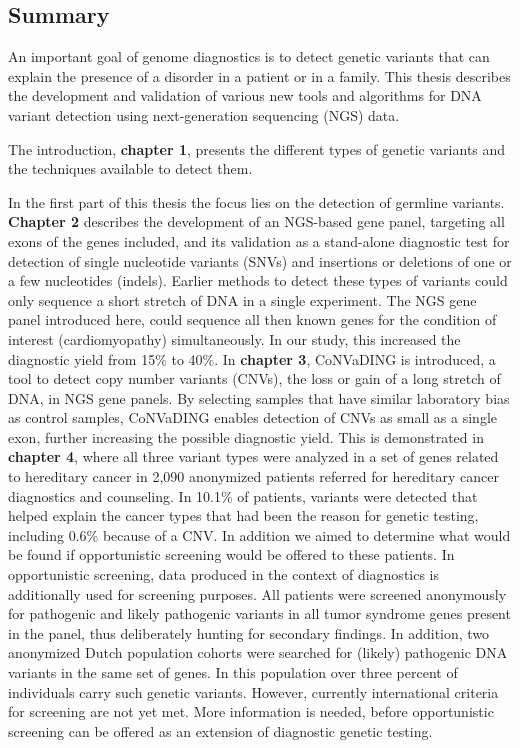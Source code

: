 \begin{appendices}
	
	\chapter{Summary}
	An important goal of genome diagnostics is to detect genetic variants that can explain the presence of a disorder in a patient or in a family. This thesis describes the development and validation of various new tools and algorithms for DNA variant detection using next-generation sequencing (NGS) data.

	The introduction, \textbf{chapter 1}, presents the different types of genetic variants and the techniques available to detect them.

	In the first part of this thesis the focus lies on the detection of germline variants. \textbf{Chapter 2} describes the development of an NGS-based gene panel, targeting all exons of the genes included, and its validation as a stand-alone diagnostic test for detection of single nucleotide variants (SNVs) and insertions or deletions of one or a few nucleotides (indels). Earlier methods to detect these types of variants could only sequence a short stretch of DNA in a single experiment. The NGS gene panel introduced here, could sequence all then known genes for the condition of interest (cardiomyopathy) simultaneously. In our study, this increased the diagnostic yield from 15\% to 40\%. In \textbf{chapter 3}, CoNVaDING is introduced, a tool to detect copy number variants (CNVs), the loss or gain of a long stretch of DNA, in NGS gene panels. By selecting samples that have similar laboratory bias as control samples, CoNVaDING enables detection of CNVs as small as a single exon, further increasing the possible diagnostic yield. This is demonstrated in \textbf{chapter 4}, where all three variant types were analyzed in a set of genes related to hereditary cancer in 2,090 anonymized patients referred for hereditary cancer diagnostics and counseling. In 10.1\% of patients, variants were detected that helped explain the cancer types that had been the reason for genetic testing, including 0.6\% because of a CNV. In addition we aimed to determine what would be found if opportunistic screening would be offered to these patients. In opportunistic screening, data produced in the context of diagnostics is additionally used for screening purposes. All patients were screened anonymously for pathogenic and likely pathogenic variants in all tumor syndrome genes present in the panel, thus deliberately hunting for secondary findings. In addition, two anonymized Dutch population cohorts were searched for (likely) pathogenic DNA variants in the same set of genes. In this population over three percent of individuals carry such genetic variants. However, currently international criteria for screening are not yet met. More information is needed, before opportunistic screening can be offered as an extension of diagnostic genetic testing.


\end{appendices}

